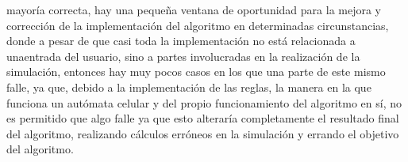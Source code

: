         mayor\'ia correcta, hay una peque\~na ventana de oportunidad
        para la mejora y correcci\'on de la implementaci\'on del
        algoritmo en determinadas circunstancias, donde a pesar de
        que casi toda la implementaci\'on no est\'a relacionada a unaentrada del usuario, sino a partes involucradas en la
        realizaci\'on de la simulaci\'on, entonces hay muy pocos casos
        en los que una parte de este mismo falle, ya que, debido a la
        implementaci\'on de las reglas, la manera en la que funciona
        un aut\'omata celular y del propio funcionamiento del
        algoritmo en s\'i, no es permitido que algo falle ya que esto
        alterar\'ia completamente el resultado final del algoritmo,
        realizando c\'alculos err\'oneos en la simulaci\'on y errando el
        objetivo del algoritmo.
